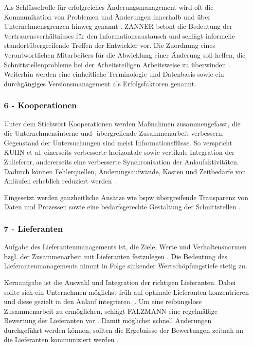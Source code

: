 Als Schlüsselrolle für erfolgreiches Änderungsmanagement wird oft die Kommunikation von Problemen und Änderungen innerhalb und über Unternehmensgrenzen hinweg genannt \cite{Kuhn2002, Schuh2008}.
ZANNER betont die Bedeutung der Vertrauensverhältnisses für den Informationsaustausch und schlägt informelle standortübergreifende Treffen der Entwickler vor. Die Zuordnung eines Verantwortlichen Mitarbeiters für die Abwicklung einer Änderung soll helfen, die Schnittstellenprobleme bei der Arbeitsteiligen Arbeitsweise zu überwinden  \cite[42]{Zanner2002}.
Weiterhin werden eine einheitliche Terminologie \cite{Zanner2002} und Datenbasis sowie ein durchgängiges Versionsmanagement \cite{Kuhn2002} als Erfolgsfaktoren genannt. 
\subsubsection*{6 - Kooperationen}
Unter dem Stichwort Kooperationen werden Maßnahmen zusammengefasst, die die Unternehmensinterne und -übergreifende Zusammenarbeit verbessern. Gegenstand der Untersuchungen sind meist Informationsflüsse. 
So verspricht KUHN et al. einerseits verbesserte horizontale sowie vertikale Integration der Zulieferer, andererseits eine verbesserte Synchronisation der Anlaufaktivitäten. Dadurch können Fehlerquellen, Änderungsaufwände, Kosten und Zeitbedarfe von Anläufen erheblich reduziert werden \cite[26]{Kuhn2002}. 

Eingesetzt werden ganzheitliche Ansätze wie \gls{bspw} übergreifende Transparenz von Daten und Prozessen sowie eine bedarfsgerechte Gestaltung der Schnittstellen \cite{Kuhn2002}. 

\subsubsection*{7 - Lieferanten}
Aufgabe des Lieferantenmanagements ist, die Ziele, Werte und Verhaltensnormen bzgl. der Zusammenarbeit mit Lieferanten festzulegen \cite{Schuh2008}. 
Die Bedeutung des Lieferantenmanagements nimmt in Folge sinkender Wertschöpfungstiefe stetig zu. 

Kernaufgabe ist die Auswahl und Integration der richtigen Lieferanten. Dabei sollte sich ein Unternehmen möglichst früh auf optimale Lieferanten konzentrieren und diese gezielt in den Anlauf integrieren. \cite{Schuh2008}.  
Um eine reibungslose Zusammenarbeit zu ermöglichen, schlägt FALZMANN eine regelmäßige Bewertung der Lieferanten vor \cite{Falzmann2007}. Damit möglichst schnell Änderungen durchgeführt werden können, sollten die Ergebnisse der Bewertungen zeitnah an die Lieferanten kommuniziert werden \cite{Hofbauer2012}. 


